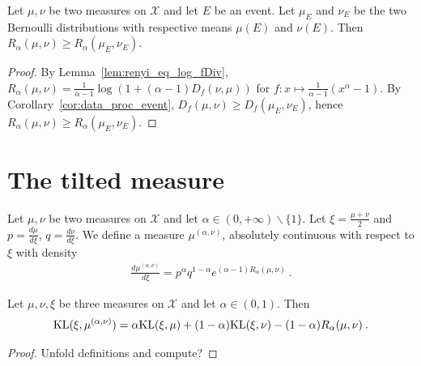 \begin{lemma}
  \label{lem:renyi_data_proc_event}
  Let $\mu, \nu$ be two measures on $\mathcal X$ and let $E$ be an event. Let $\mu_E$ and $\nu_E$ be the two Bernoulli distributions with respective means $\mu(E)$ and $\nu(E)$.
  Then $R_\alpha(\mu, \nu) \ge R_\alpha(\mu_E, \nu_E)$.
\end{lemma}

\begin{proof}
By Lemma~\ref{lem:renyi_eq_log_fDiv}, $R_\alpha(\mu, \nu) = \frac{1}{\alpha - 1} \log (1 + (\alpha - 1) D_f(\nu, \mu))$ for $f : x \mapsto \frac{1}{\alpha - 1}(x^{\alpha} - 1)$.
By Corollary~\ref{cor:data_proc_event}, $D_f(\mu, \nu) \ge D_f(\mu_E, \nu_E)$, hence $R_\alpha(\mu, \nu) \ge R_\alpha(\mu_E, \nu_E)$.
\end{proof}

\section{The tilted measure}

\begin{definition}
  \label{def:renyi_measure}
  Let $\mu, \nu$ be two measures on $\mathcal X$ and let $\alpha \in (0, +\infty) \backslash \{1\}$. Let $\xi = \frac{\mu + \nu}{2}$ and $p = \frac{d \mu}{d \xi}$, $q = \frac{d \nu}{d \xi}$. We define a measure $\mu^{(\alpha, \nu)}$, absolutely continuous with respect to $\xi$ with density
  \begin{align*}
  \frac{d \mu^{(\alpha, \nu)}}{d \xi} = p^\alpha q^{1 - \alpha} e^{(\alpha - 1)R_\alpha(\mu, \nu)} \: .
  \end{align*}
\end{definition}

\begin{lemma}
  \label{lem:kl_renyi_measure_eq}
  Let $\mu, \nu, \xi$ be three measures on $\mathcal X$ and let $\alpha \in (0, 1)$. Then
  \begin{align*}
  \mathrm{KL}(\xi, \mu^{(\alpha, \nu)}) = \alpha \mathrm{KL}(\xi, \mu) + (1 - \alpha)\mathrm{KL}(\xi, \nu) - (1 - \alpha) R_\alpha(\mu, \nu) \: .
  \end{align*}
\end{lemma}

\begin{proof}
Unfold definitions and compute?
\end{proof}

